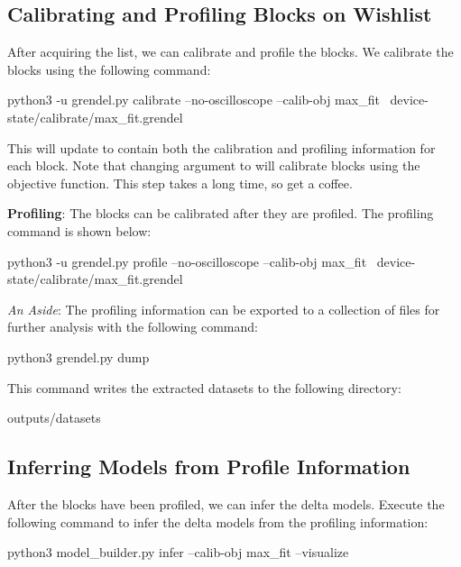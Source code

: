 \subsection{Calibrating and Profiling Blocks on Wishlist}

After acquiring the list, we can calibrate and profile the blocks. We calibrate
the blocks using the following command:

\begin{snippet}
  python3 -u grendel.py calibrate --no-oscilloscope --calib-obj max_fit \
     device-state/calibrate/max_fit.grendel

\end{snippet}

This will update  to contain both the calibration and
profiling information for each block. Note that changing \tx{--calib-obj} argument to
 will calibrate blocks using the \tx{min_error} objective
function. This step takes a long time, so get a coffee.


\textbf{Profiling}: The blocks can be calibrated after they are profiled. The
profiling command is shown below:

\begin{snippet}
  python3 -u grendel.py profile --no-oscilloscope --calib-obj max_fit \
     device-state/calibrate/max_fit.grendel
\end{snippet}


\textit{An Aside}: The profiling information can be exported to a collection of
 files for further analysis with the following command:

\begin{snippet}
  python3 grendel.py dump
\end{snippet}

This command writes the extracted datasets to the following directory:

\begin{snippet}
outputs/datasets
\end{snippet}


\subsection {Inferring Models from Profile Information}

After the blocks have been profiled, we can infer the delta models. Execute the
following command to infer the delta models from the profiling information:

\begin{snippet}
  python3 model_builder.py infer --calib-obj max_fit --visualize
\end{snippet}

